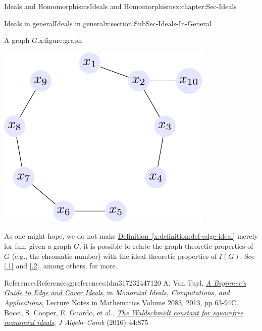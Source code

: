 \documentclass[oneside,10pt,]{book}
\newcommand{\xreffont}{\relax}
\numberwithin{equation}{section}
\begin{document}
\begin{chapterptx}{Ideals and Homomorphisms}{}{Ideals and Homomorphisms}{}{}{x:chapter:Sec-Ideals}
\begin{sectionptx}{Ideals in general}{}{Ideals in general}{}{}{x:section:SubSec-Ideals-In-General}
\begin{figureptx}{A graph \(G\).}{x:figure:graph}{}
\begin{image}{0.25}{0.5}{0.25}
\includegraphics[width=\linewidth]{./images/graph.svg}
\end{image}%
\tcblower
\end{figureptx}%
As one might hope, we do not make \hyperref[x:definition:def-edge-ideal]{Definition~{\xreffont\ref{x:definition:def-edge-ideal}}} merely for fun; given a graph \(G\), it is possible to relate the graph-theoretic properties of \(G\) (e.g., the chromatic number) with the ideal-theoretic properties of \(I(G)\). See \hyperlink{x:biblio:vantuyl-intro}{[{\xreffont 4.1.1}]} and \hyperlink{x:biblio:mfo-waldschmidt}{[{\xreffont 4.1.2}]}, among others, for more.%
%
%
\typeout{************************************************}
\typeout{************************************************}
%
\begin{references-subsection-numberless}{References}{}{References}{}{}{g:references:idm317232447120}
A. Van Tuyl, \emph{\href{http://dx.doi.org/doi:10.1007/978-3-642-38742-5_3}{A Beginner's Guide to Edge and Cover Ideals}}, in \emph{Monomial Ideals, Computations, and Applications}, Lecture Notes in Mathematics Volume 2083, 2013, pp 63-94C. Bocci, S. Cooper, E. Guardo, et al., \emph{\href{https://doi.org/10.1007/s10801-016-0693-7}{The Waldschmidt constant for squarefree monomial ideals}}, \emph{J Algebr Comb} (2016) 44:875\end{references-subsection-numberless}
\end{sectionptx}
%
%
\typeout{************************************************}

\end{chapterptx}
\end{document}
